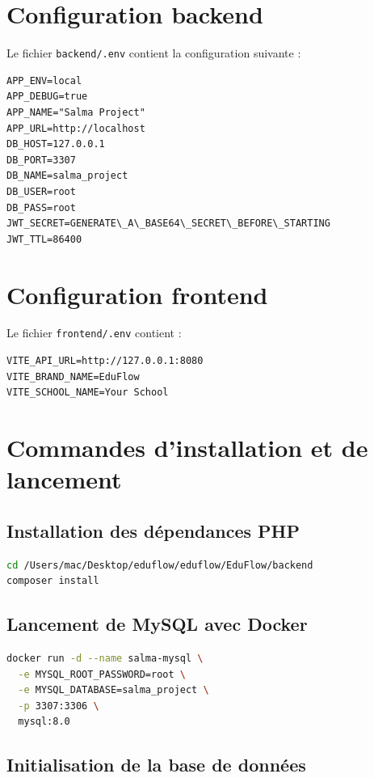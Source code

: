 \documentclass[12pt,a4paper]{report}
\begin{document}
\section{Configuration backend}

Le fichier \texttt{backend/.env} contient la configuration suivante :

\begin{lstlisting}
APP_ENV=local
APP_DEBUG=true
APP_NAME="Salma Project"
APP_URL=http://localhost
DB_HOST=127.0.0.1
DB_PORT=3307
DB_NAME=salma_project
DB_USER=root
DB_PASS=root
JWT_SECRET=GENERATE\_A\_BASE64\_SECRET\_BEFORE\_STARTING
JWT_TTL=86400
\end{lstlisting}

\section{Configuration frontend}

Le fichier \texttt{frontend/.env} contient :

\begin{lstlisting}
VITE_API_URL=http://127.0.0.1:8080
VITE_BRAND_NAME=EduFlow
VITE_SCHOOL_NAME=Your School
\end{lstlisting}

\section{Commandes d'installation et de lancement}

\subsection{Installation des dépendances PHP}

\begin{lstlisting}[language=bash]
cd /Users/mac/Desktop/eduflow/eduflow/EduFlow/backend
composer install
\end{lstlisting}

\subsection{Lancement de MySQL avec Docker}

\begin{lstlisting}[language=bash]
docker run -d --name salma-mysql \
  -e MYSQL_ROOT_PASSWORD=root \
  -e MYSQL_DATABASE=salma_project \
  -p 3307:3306 \
  mysql:8.0
\end{lstlisting}

\subsection{Initialisation de la base de données}
\end{document}
